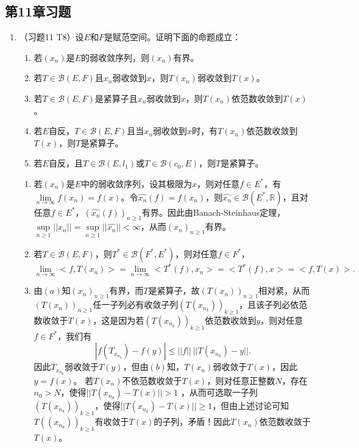 \subsection{第11章习题}
\begin{enumerate}
  \item （习题11 T8）设$E$和$F$是赋范空间。证明下面的命题成立： 
    \begin{enumerate}
      \item 若$(x_n)$是$E$的弱收敛序列，则$(x_n)$有界。 
      \item 若$T\in\mathcal{B}(E,F)$且$x_n$弱收敛到$x$，则$T(x_n)$弱收敛到$T(x)$。 
      \item 若$T\in\mathcal{B}(E,F)$是紧算子且$x_n$弱收敛到$x$，则$T(x_n)$依范数收敛到$T(x)$。 
      \item 若$E$自反，$T\in\mathcal{B}(E,F)$且当$x_n$弱收敛到$x$时，有$T(x_n)$依范数收敛到 $T(x)$，则$T$是紧算子。 
      \item 若$E$自反，且$T\in\mathcal{B}(E,l_1)$或$T\in\mathcal{B}(c_0,E)$，则$T$是紧算子。
    \end{enumerate}
    \begin{answer}
      \begin{enumerate}
        \item 若$(x_n)$是$E$中的弱收敛序列，设其极限为$x$，则对任意$f\in E^*$，有$\lim\limits_{n\rightarrow \infty}f(x_n)=f(x)$。令$\hat{x_n}(f)=f(x_n)$，则$\hat{x_n}\in\mathcal{B}(E^*,\mathbb{R})$，且对任意$f\in E^*$，$(\hat{x_n}(f))_{n\geqslant 1}$有界。因此由Banach-Steinhaus定理，$\sup\limits_{n\geqslant 1}||x_n||=\sup\limits_{n\geqslant 1}||\hat{x_n}||<\infty$，从而$(x_n)_{n\geqslant 1}$有界。 

        \item 若$T\in\mathcal{B}(E,F)$，则$T^*\in\mathcal{B}(F^*,E^*)$，则对任意$f\in F^*$，
        \[ \lim\limits_{n\rightarrow \infty}<f,T(x_n)>=\lim\limits_{n\rightarrow \infty}<T^*(f),x_n>=<T^*(f),x>=<f,T(x)>.\] 
        
        \item 由$(a)$知$(x_n)_{n\geqslant 1}$有界，而$T$是紧算子，故$(T(x_n))_{n\geqslant 1}$相对紧，从而$(T(x_n))_{n\geqslant 1}$任一子列必有收敛子列$(T(x_{n_k}))_{k\geqslant 1 }$，且该子列必依范数收敛于$T(x)$，这是因为若$(T(x_{n_k}))_{k\geqslant 1}$依范数收敛到$y$，则对任意$f\in F^*$，我们有
        \[|f(T_{x_{n_k}})-f(y)|\leqslant ||f||~||T(x_{n_k})-y||.\]
        因此$T_{x_{n_k}}$弱收敛于$T(y)$，但由$(b)$知，$T(x_n)$弱收敛于$T(x)$，因此$y=f(x)$。 若$T(x_n)$不依范数收敛于$T(x)$，则对任意正整数$N$，存在$n_0>N$，使得$||T(x_{n_0})-T(x)||>1$
        ，从而可选取一子列$(T(x_{n_k}))_{k\geqslant 1}$，使得$||T(x_{n_k})-T(x)||\geqslant1$，但由上述讨论可知$T((x_{n_k}))_{k\geqslant 1}$有收敛于$T(x)$的子列，矛盾！因此$T(x_n)$依范数收敛于$T(x)$。 
        

\end{enumerate}
\end{answer}
\end{enumerate}
